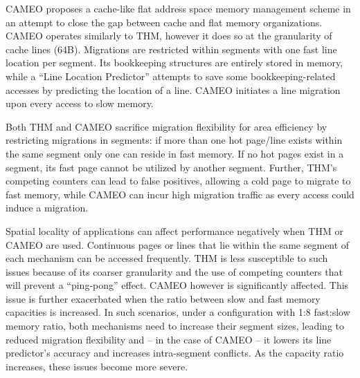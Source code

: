 CAMEO \cite{cameo} proposes a cache-like flat address space memory management scheme in an attempt to close the gap between cache and flat memory organizations. CAMEO operates similarly to THM, however it does so at the granularity of cache lines (64B). Migrations are restricted within segments with one fast line location per segment. Its bookkeeping structures are entirely stored in memory, while a ``Line Location Predictor'' attempts to save some bookkeeping-related accesses by predicting the location of a line. CAMEO initiates a line migration upon every access to slow memory.

Both THM and CAMEO sacrifice migration flexibility for area efficiency by restricting migrations in segments: if more than one hot page/line exists within the same segment only one can reside in fast memory. If no hot pages exist in a segment, its fast page cannot be utilized by another segment. Further, THM's competing counters can lead to false positives, allowing a cold page to migrate to fast memory, while CAMEO can incur high migration traffic as every access could induce a migration. 

Spatial locality of applications can affect performance negatively when THM or CAMEO are used. Continuous pages or lines that lie within the same segment of each mechanism can be accessed frequently. THM is less susceptible to such issues because of its coarser granularity and the use of competing counters that will prevent a ``ping-pong'' effect. CAMEO however is significantly affected. This issue is further exacerbated when the ratio between slow and fast memory capacities is increased. In such scenarios, under a configuration with 1:8 fast:slow memory ratio, both mechanisms need to increase their segment sizes, leading to reduced migration flexibility and -- in the case of CAMEO -- it lowers its line predictor's accuracy and increases intra-segment conflicts. As the capacity ratio increases, these issues become more severe.
